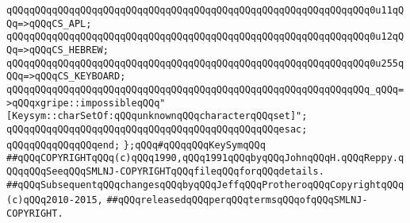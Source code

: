 \verb|qQQqqQQqqQQqqQQqqQQqqQQqqQQqqQQqqQQqqQQqqQQqqQQqqQQqqQQqqQQqqQQq0u11qQQq=>qQQqCS_APL;|\newline
\verb|qQQqqQQqqQQqqQQqqQQqqQQqqQQqqQQqqQQqqQQqqQQqqQQqqQQqqQQqqQQqqQQq0u12qQQq=>qQQqCS_HEBREW;|\newline
\verb|qQQqqQQqqQQqqQQqqQQqqQQqqQQqqQQqqQQqqQQqqQQqqQQqqQQqqQQqqQQqqQQq0u255qQQq=>qQQqCS_KEYBOARD;|\newline
\verb|qQQqqQQqqQQqqQQqqQQqqQQqqQQqqQQqqQQqqQQqqQQqqQQqqQQqqQQqqQQqqQQq_qQQq=>qQQqxgripe::impossibleqQQq"[Keysym::charSetOf:qQQqunknownqQQqcharacterqQQqset]";|\newline
\verb|qQQqqQQqqQQqqQQqqQQqqQQqqQQqqQQqqQQqqQQqqQQqqQQqesac;|\newline
\verb|qQQqqQQqqQQqqQQqend;|\newline
\newline
\verb|};qQQq#qQQqqQQqKeySymqQQq|\newline
\newline
\newline
\verb|##qQQqCOPYRIGHTqQQq(c)qQQq1990,qQQq1991qQQqbyqQQqJohnqQQqH.qQQqReppy.qQQqqQQqSeeqQQqSMLNJ-COPYRIGHTqQQqfileqQQqforqQQqdetails.|\newline
\verb|##qQQqSubsequentqQQqchangesqQQqbyqQQqJeffqQQqProtheroqQQqCopyrightqQQq(c)qQQq2010-2015,|\newline
\verb|##qQQqreleasedqQQqperqQQqtermsqQQqofqQQqSMLNJ-COPYRIGHT.|\newline

